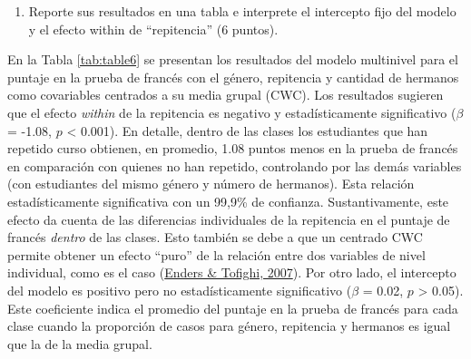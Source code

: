 \documentclass[
  12pt,
  a4paper,
]{article}
\providecommand{\tightlist}{%
  \setlength{\itemsep}{0pt}\setlength{\parskip}{0pt}}
\begin{document}
\begin{enumerate}
\def\labelenumi{\alph{enumi})}
\tightlist
\item
  Reporte sus resultados en una tabla e interprete el intercepto fijo del modelo y el efecto within de ``repitencia'' (6 puntos).
\end{enumerate}

En la Tabla \ref{tab:table6} se presentan los resultados del modelo multinivel para el puntaje en la prueba de francés con el género, repitencia y cantidad de hermanos como covariables centrados a su media grupal (CWC). Los resultados sugieren que el efecto \emph{within} de la repitencia es negativo y estadísticamente significativo (\(\beta\) = -1.08, \(p\) \textless{} 0.001). En detalle, dentro de las clases los estudiantes que han repetido curso obtienen, en promedio, 1.08 puntos menos en la prueba de francés en comparación con quienes no han repetido, controlando por las demás variables (con estudiantes del mismo género y número de hermanos). Esta relación estadísticamente significativa con un 99,9\% de confianza. Sustantivamente, este efecto da cuenta de las diferencias individuales de la repitencia en el puntaje de francés \emph{dentro} de las clases. Esto también se debe a que un centrado CWC permite obtener un efecto ``puro'' de la relación entre dos variables de nivel individual, como es el caso (\protect\hyperlink{ref-enders_centering_2007}{Enders \& Tofighi, 2007}). Por otro lado, el intercepto del modelo es positivo pero no estadísticamente significativo (\(\beta\) = 0.02, \(p\) \textgreater{} 0.05). Este coeficiente indica el promedio del puntaje en la prueba de francés para cada clase cuando la proporción de casos para género, repitencia y hermanos es igual que la de la media grupal.
\end{document}
